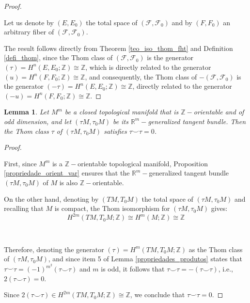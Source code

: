\documentclass[12pt,oneside]{book}
\newtheorem{lem}    {Lemma}[chapter]
\newcommand{\R}{\mathbb{R}}
\newcommand{\Z}{\mathbb{Z}}
\newcommand{\ccup}{\smile}
\begin{document}
    \begin{proof}

        \

        Let us denote by $(E,E_{0})$ the total space of $(\mathcal{F},\mathcal{F}_{0})$ and by $(F,F_{0})$ an arbitrary fiber of $(\mathcal{F},\mathcal{F}_{0})$.

        The result follows directly from Theorem \ref{teo_iso_thom_fht} and Definition \ref{defi_thom}, since the Thom class of $(\mathcal{F},\mathcal{F}_{0})$ is the generator $(\tau)=H^{n}(E,E_{0};\Z)\cong\Z$, which is directly related to the generator $(u)=H^{n}(F,F_{0};\Z)\cong\Z$, and consequently, the Thom class of $-(\mathcal{F},\mathcal{F}_{0})$ is the generator $(-\tau)=H^{n}(E,E_{0};\Z)\cong\Z$, directly related to the generator $(-u)=H^{n}(F,F_{0};\Z)\cong\Z$.

    \end{proof}

    \begin{lem}\label{lema_thom_5}
        Let $M^{m}$ be a closed topological manifold that is $\Z-$orientable and of odd dimension, and let 
        $(\tau M,\tau_{0}M)$ be its $\R^{m}-$generalized tangent bundle. Then the Thom 
        class $\tau$ of $(\tau M,\tau_{0}M)$ satisfies $\tau\ccup\tau=0$.
    \end{lem}

    \begin{proof}

        \

        First, since $M^{m}$ is a $\Z-$orientable topological manifold, Proposition \ref{propriedade_orient_var} ensures that the 
        $\R^{m}-$generalized tangent bundle $(\tau M,\tau_{0}M)$ of $M$ is also $\Z-$orientable.

        On the other hand, denoting by $(TM,T_{0}M)$ the total space of $(\tau M,\tau_{0}M)$ and recalling that $M$ is compact, the Thom 
        isomorphism for $(\tau M,\tau_{0}M)$ gives:
        $$ H^{2m}(TM,T_{0}M;\Z)\cong H^{m}(M;\Z)\cong\Z $$

        \

        Therefore, denoting the generator $(\tau)=H^{m}(TM,T_{0}M;\Z)$ as the Thom class of $(\tau M,\tau_{0}M)$, and since item 5 of 
        Lemma \ref{propriedades_produtos} states that $\tau\ccup\tau =(-1)^{m^{2}}(\tau\ccup\tau)$ and $m$ is odd, it follows that 
        $\tau\ccup\tau=-(\tau\ccup\tau)$, i.e., $2(\tau\ccup\tau)=0$.

        Since $2(\tau\ccup\tau)\in H^{2m}(TM,T_{0}M;\Z)\cong\Z$, we conclude that $\tau\ccup\tau=0$.

    \end{proof}
\end{document}
